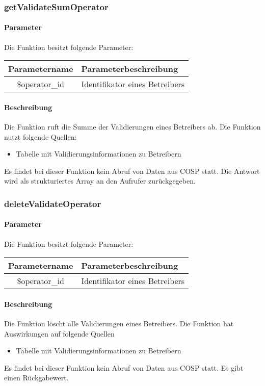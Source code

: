 \subsubsection{getValidateSumOperator}
\paragraph{Parameter} Die Funktion besitzt folgende Parameter:
\begin{table}[H]
	\begin{tabular}{|c|p{11cm}|}
		\hline
		\textbf{Parametername} & \textbf{Parameterbeschreibung} \\ \hline
		\$operator\_id & Identifikator eines Betreibers \\ \hline
	\end{tabular}
\end{table}
\paragraph{Beschreibung} Die Funktion ruft die Summe der Validierungen eines Betreibers ab. Die Funktion nutzt folgende Quellen:
\begin{itemize}
	\item Tabelle mit Validierungsinformationen zu Betreibern
\end{itemize}
Es findet bei dieser Funktion kein Abruf von Daten aus {\glqq COSP\grqq} statt. Die Antwort wird als strukturiertes Array an den Aufrufer zurückgegeben.
\subsubsection{deleteValidateOperator}
\paragraph{Parameter} Die Funktion besitzt folgende Parameter:
\begin{table}[H]
	\begin{tabular}{|c|p{11cm}|}
		\hline
		\textbf{Parametername} & \textbf{Parameterbeschreibung} \\ \hline
		\$operator\_id & Identifikator eines Betreibers \\ \hline
	\end{tabular}
\end{table}
\paragraph{Beschreibung} Die Funktion löscht alle Validierungen eines Betreibers. Die Funktion hat Auswirkungen auf folgende Quellen
\begin{itemize}
	\item Tabelle mit Validierungsinformationen zu Betreibern
\end{itemize}
Es findet bei dieser Funktion kein Abruf von Daten aus {\glqq COSP\grqq} statt. Es gibt einen Rückgabewert.
